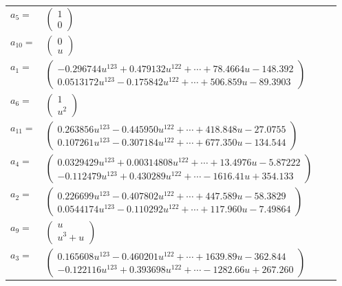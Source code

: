 \documentclass[1p]{elsarticle_modified}
\theoremstyle{definition}
\begin{document}
\begin{tabular}{m{7pt} m{180pt} m{7pt} m{180pt} }
\flushright $a_{5}=$&$\begin{pmatrix}1\\0\end{pmatrix}$ \\
\flushright $a_{10}=$&$\begin{pmatrix}0\\u\end{pmatrix}$ \\
\flushright $a_{1}=$&$\begin{pmatrix}-0.296744 u^{123}+0.479132 u^{122}+\cdots+78.4664 u-148.392\\0.0513172 u^{123}-0.175842 u^{122}+\cdots+506.859 u-89.3903\end{pmatrix}$ \\
\flushright $a_{6}=$&$\begin{pmatrix}1\\u^2\end{pmatrix}$ \\
\flushright $a_{11}=$&$\begin{pmatrix}0.263856 u^{123}-0.445950 u^{122}+\cdots+418.848 u-27.0755\\0.107261 u^{123}-0.307184 u^{122}+\cdots+677.350 u-134.544\end{pmatrix}$ \\
\flushright $a_{4}=$&$\begin{pmatrix}0.0329429 u^{123}+0.00314808 u^{122}+\cdots+13.4976 u-5.87222\\-0.112479 u^{123}+0.430289 u^{122}+\cdots-1616.41 u+354.133\end{pmatrix}$ \\
\flushright $a_{2}=$&$\begin{pmatrix}0.226699 u^{123}-0.407802 u^{122}+\cdots+447.589 u-58.3829\\0.0544174 u^{123}-0.110292 u^{122}+\cdots+117.960 u-7.49864\end{pmatrix}$ \\
\flushright $a_{9}=$&$\begin{pmatrix}u\\u^3+u\end{pmatrix}$ \\
\flushright $a_{3}=$&$\begin{pmatrix}0.165608 u^{123}-0.460201 u^{122}+\cdots+1639.89 u-362.844\\-0.122116 u^{123}+0.393698 u^{122}+\cdots-1282.66 u+267.260\end{pmatrix}$ \\

\end{tabular}
\end{document}
